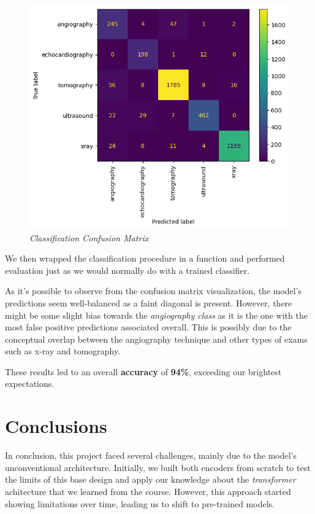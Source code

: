 \documentclass[10pt,twocolumn,letterpaper]{article}
\begin{document}
\begin{figure}[H]
   \centering
   \includegraphics[width=1\linewidth]{img/Classification_Result.png}
   \caption{\textit{Classification Confusion Matrix}}
\end{figure}

We then wrapped the classification procedure in a function and performed evaluation just as we would normally do with a trained classifier.

As it's possible to observe from the confusion matrix visualization, the model's predictions seem well-balanced as a faint diagonal is present.
However, there might be some slight bias towards the \textit{angiography class} as it is the one with the most false positive predictions associated overall.
This is possibly due to the conceptual overlap between the angiography technique and other types of exams such as x-ray and tomography.

These results led to an overall \textbf{accuracy} of \textbf{94\%}, exceeding our brightest expectations.


\section{Conclusions}

In conclusion, this project faced several challenges, mainly due to the model's unconventional architecture. Initially, we built both encoders from scratch to test the limits of this base design and apply our knowledge about the \textit{transformer} achitecture that we learned from the course. However, this approach started showing limitations over time, leading us to shift to pre-trained models.
\end{document}
